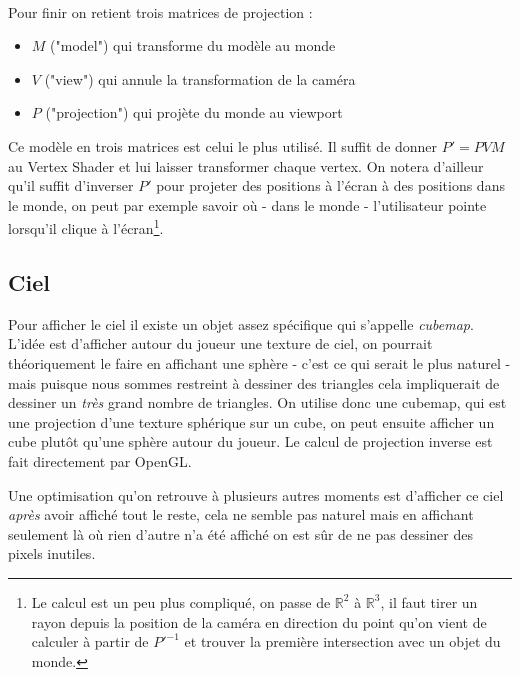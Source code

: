 \documentclass[11pt]{article} %
\begin{document}
\paragraph{}
Pour finir on retient trois matrices de projection :
\begin{itemize}
	\item{$M$ ("model") qui transforme du modèle au monde}
	\item{$V$ ("view") qui annule la transformation de la caméra}
	\item{$P$ ("projection") qui projète du monde au viewport}
\end{itemize}

Ce modèle en trois matrices est celui le plus utilisé. Il suffit de donner $P'=PVM$ au Vertex Shader et lui laisser transformer chaque vertex. On notera d'ailleur qu'il suffit d'inverser $P'$ pour projeter des positions à l'écran à des positions dans le monde, on peut par exemple savoir où - dans le monde - l'utilisateur pointe lorsqu'il clique à l'écran\footnote{Le calcul est un peu plus compliqué, on passe de $\mathbb{R}^2$ à $\mathbb{R}^3$, il faut tirer un rayon depuis la position de la caméra en direction du point qu'on vient de calculer à partir de $P'^{-1}$ et trouver la première intersection avec un objet du monde.}.


\subsection{Ciel}
\label{sec:sky}

Pour afficher le ciel il existe un objet assez spécifique qui s'appelle \textit{cubemap}. L'idée est d'afficher autour du joueur une texture de ciel, on pourrait théoriquement le faire en affichant une sphère - c'est ce qui serait le plus naturel - mais puisque nous sommes restreint à dessiner des triangles cela impliquerait de dessiner un \textit{très} grand nombre de triangles. On utilise donc une cubemap, qui est une projection d'une texture sphérique sur un cube, on peut ensuite afficher un cube plutôt qu'une sphère autour du joueur. Le calcul de projection inverse est fait directement par OpenGL.

Une optimisation qu'on retrouve à plusieurs autres moments est d'afficher ce ciel \textit{après} avoir affiché tout le reste, cela ne semble pas naturel mais en affichant seulement là où rien d'autre n'a été affiché on est sûr de ne pas dessiner des pixels inutiles.
\end{document}
